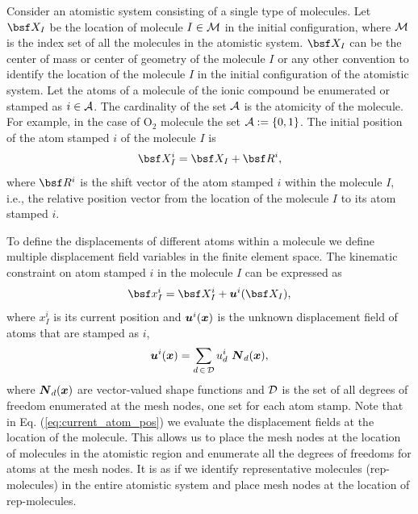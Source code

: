 \documentclass[a4paper,10pt]{article}
\newcommand{\refeq}[1]{Eq. (\ref{eq:#1})}
\def\gz  #1{           \mbox{\boldmath $\mit #1$}}
\def\mcl  #1{               {\cal #1}}
\begin{document}
Consider an atomistic system consisting of a single type of molecules.
Let $\bsf X_I$ be the location of molecule $I \in \mcl M$ in the initial 
configuration, where $\mcl M$ is the index set of all the molecules in the 
atomistic system. $\bsf X_I$ can be the center of mass or center of geometry of 
the molecule $I$ or any other convention to identify the location of 
the molecule $I$ in the initial configuration of the atomistic system. Let the 
atoms of a molecule of the ionic compound be enumerated or stamped as $i \in 
\mcl A$. The cardinality of the set $\mcl A$ is the atomicity of the molecule. 
For example, in the case of O$_2$ molecule the set $\mcl A := \left\lbrace 0,1 
\right\rbrace$. The initial position of the atom stamped $i$ of the molecule 
$I$ is
\begin{align}
 \bsf X_I ^i = \bsf X_I + \bsf R^i,
\end{align}
where $\bsf R^i$ is the shift vector of the atom stamped $i$ within the 
molecule $I$, i.e., the relative position vector from the location of the 
molecule $I$ to its atom stamped $i$.

To define the displacements of different atoms within a molecule we define
multiple displacement field variables in the finite element space. The 
kinematic constraint on atom stamped $i$ in the molecule $I$ can be 
expressed as
\begin{align}
 \bsf x_I^i = \bsf X_I^i + \gz u^i(\bsf X_I),
 \label{eq:current_atom_pos}
\end{align}
where $x_I^i$ is its current position and $\gz u^i( \gz x)$ is the unknown
displacement field of atoms that are stamped as $i$,
\begin{align}
 \gz u^i (\gz x) = \sum_{d \, \in \, \mcl D} u^i_d \,\, \gz N_d (\gz x),
\end{align}
where $\gz N_d (\gz x)$ are vector-valued shape functions and $\mcl D$ is the 
set of all degrees of freedom enumerated at the mesh nodes, one set for each 
atom stamp.
Note that in \refeq{current_atom_pos} we evaluate the displacement fields at 
the location of the molecule. This allows us to place the mesh nodes at the 
location of molecules in the atomistic region and enumerate all the degrees of 
freedoms for atoms at the mesh nodes. It is as if we identify representative 
molecules (rep-molecules) in the entire atomistic system and place mesh nodes 
at the location of rep-molecules.
\end{document}
